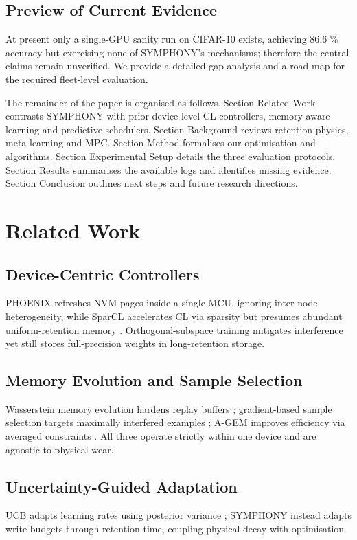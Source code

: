 \documentclass{article}
\begin{document}
\subsection{Preview of Current Evidence}
At present only a single-GPU sanity run on CIFAR-10 exists, achieving 86.6 \% accuracy but exercising none of SYMPHONY’s mechanisms; therefore the central claims remain unverified. We provide a detailed gap analysis and a road-map for the required fleet-level evaluation.

The remainder of the paper is organised as follows. Section Related Work contrasts SYMPHONY with prior device-level CL controllers, memory-aware learning and predictive schedulers. Section Background reviews retention physics, meta-learning and MPC. Section Method formalises our optimisation and algorithms. Section Experimental Setup details the three evaluation protocols. Section Results summarises the available logs and identifies missing evidence. Section Conclusion outlines next steps and future research directions.

\section{Related Work}
\subsection{Device-Centric Controllers}
PHOENIX refreshes NVM pages inside a single MCU, ignoring inter-node heterogeneity, while SparCL accelerates CL via sparsity but presumes abundant uniform-retention memory \cite{wang-2022-sparcl}. Orthogonal-subspace training mitigates interference \cite{chaudhry-2020-continual} yet still stores full-precision weights in long-retention storage.

\subsection{Memory Evolution and Sample Selection}
Wasserstein memory evolution hardens replay buffers \cite{wang-2022-improving}; gradient-based sample selection targets maximally interfered examples \cite{aljundi-2019-gradient}; A-GEM improves efficiency via averaged constraints \cite{chaudhry-2018-lifelong}. All three operate strictly within one device and are agnostic to physical wear.

\subsection{Uncertainty-Guided Adaptation}
UCB adapts learning rates using posterior variance \cite{ebrahimi-2019-uncertainty}; SYMPHONY instead adapts write budgets through retention time, coupling physical decay with optimisation.
\end{document}
